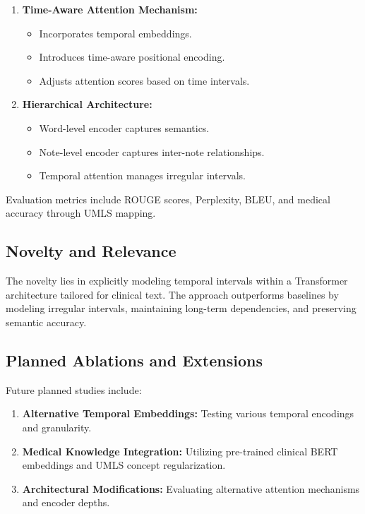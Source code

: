\documentclass[twocolumn]{article}
\begin{document}
\begin{enumerate}
    \item \textbf{Time-Aware Attention Mechanism:}
    \begin{itemize}
        \item Incorporates temporal embeddings.
        \item Introduces time-aware positional encoding.
        \item Adjusts attention scores based on time intervals.
    \end{itemize}
    \item \textbf{Hierarchical Architecture:}
    \begin{itemize}
        \item Word-level encoder captures semantics.
        \item Note-level encoder captures inter-note relationships.
        \item Temporal attention manages irregular intervals.
    \end{itemize}
\end{enumerate}

Evaluation metrics include ROUGE scores, Perplexity, BLEU, and medical accuracy through UMLS mapping.

\subsection{Novelty and Relevance}

The novelty lies in explicitly modeling temporal intervals within a Transformer architecture tailored for clinical text. The approach outperforms baselines by modeling irregular intervals, maintaining long-term dependencies, and preserving semantic accuracy.

\subsection{Planned Ablations and Extensions}

Future planned studies include:
\begin{enumerate}
    \item \textbf{Alternative Temporal Embeddings:} Testing various temporal encodings and granularity.
    \item \textbf{Medical Knowledge Integration:} Utilizing pre-trained clinical BERT embeddings and UMLS concept regularization.
    \item \textbf{Architectural Modifications:} Evaluating alternative attention mechanisms and encoder depths.
\end{enumerate}
\end{document}
